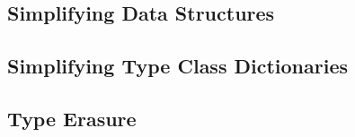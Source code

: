 \documentclass[main.tex]{subfiles}
\begin{document}
	
	\subsection{Simplifying Data Structures}
	
	\subsection{Simplifying Type Class Dictionaries}
	
	\subsection{Type Erasure}
	
\end{document}
